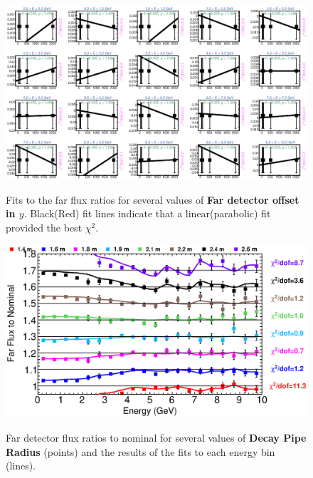 \begin{figure}[ht]
  \begin{center}
    {\includegraphics[width=5.0in]{figures/LBNEFDY_far_fits.eps}}
  \end{center}
\caption{ Fits to the far flux ratios for several values of {\bf Far detector offset in $y$}. Black(Red) fit lines indicate that a linear(parabolic) fit provided the best $\chi^2$. }
\end{figure}

\begin{figure}[ht]
  \begin{center}
    {\includegraphics[width=6.0in]{figures/DecayPipeRadius_far_summary.eps}}
  \end{center}
\caption{ Far detector flux ratios to nominal for several values of {\bf Decay Pipe Radius} (points) and the results of the fits to each energy bin (lines).}
\end{figure}

